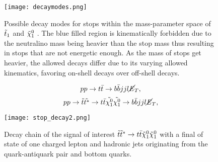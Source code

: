 \begin{figure}[htbp]
    \centering
    \texttt{[image: decaymodes.png]}
    \caption{Possible decay modes for stops within the mass-parameter space of $\Tilde{t}_1 $ and $ \Tilde{\chi}_1^0 $ \cite{aad2014search}. The blue filled region is kinematically forbidden due to the neutralino mass being heavier than the stop mass thus resulting in stops that are not energetic enough. As the mass of stops get heavier, the allowed decays differ due to its varying allowed kinematics, favoring on-shell decays over off-shell decays.}
    \label{fig:decayMode}
\end{figure}

\begin{equation}
 pp \rightarrow t \Bar{t} \rightarrow b\Bar{b}jjl\cancel{\it{E}}_{T},
 \label{eq:background}
\end{equation}
\begin{equation}
  pp \rightarrow \Tilde{t}\Tilde{t^*} \rightarrow t \Bar{t} \Tilde{\chi^0_1}\Tilde{\chi^0_1} \rightarrow b\Bar{b}jjl\cancel{\it{E}}_{T},
  \label{eq:signal}
\end{equation}

\begin{figure}[htbp]
    \centering
    \texttt{[image: stop\_decay2.png]}
    \caption{Decay chain of the signal of interest $\Tilde{t}\Tilde{t}^* \rightarrow t\bar{t}\Tilde{\chi}_1^0\Tilde{\chi}_1^0 $ with a final of state of one charged lepton and hadronic jets originating from the quark-antiquark pair and bottom quarks.}
    \label{fig:stopDecay}
\end{figure}


